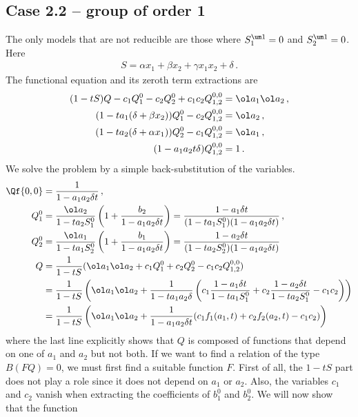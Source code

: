 \subsection{Case 2.2 -- group of order 1}
The only models that are not reducible are those where $S_1^{\um 1} = 0$ and $S_2^{\um 1} = 0$. Here
\begin{align}
	S = \alpha x_1 + \beta x_2 + \gamma x_1 x_2 + \delta\,.
\end{align}
The functional equation and its zeroth term extractions are
\begin{align}\begin{split}
(1-tS)Q - c_1 Q_1^0- c_2 Q_2^0+ c_1c_2 Q_{1,2}^{0,0}  &= \ol a_1\ol a_2\,,\\
(1-ta_1 (\delta+\beta x_2))Q_1^0 - c_2Q_{1,2}^{0,0} &=\ol a_2\,,\\
(1-ta_2 (\delta+\alpha x_1))Q_2^0 - c_1Q_{1,2}^{0,0}  &=\ol a_1\,,\\
(1-a_1 a_2 t \delta)Q_{1,2}^{0,0} &= 1\,.
\end{split}\end{align}
We solve the problem by a simple back-substitution of the variables.
\begin{align}
\Qf{0,0} & = \frac{1}{1-a_1a_2\delta t}\,,\\
Q_1^0 & = \frac{\ol a_2}{1-t a_2 S_1^0}\left(1+\frac{b_2}{1-a_1a_2 \delta t}\right) = \frac{1 -  a_1 \delta t}{(1-t a_1S_1^0)(1-a_1a_2\delta t)}\,,\\
Q_2^0 & = \frac{\ol a_1}{1-t a_1 S_2^0}\left(1+\frac{b_1}{1-a_1a_2 \delta t}\right) = \frac{1 -  a_2 \delta t}{(1-t a_2S_2^0)(1-a_1a_2\delta t)}\\
Q &= \frac{1}{1-tS}(\ol a_1\ol a_2 + c_1 Q_1^0 + c_2 Q_2^0 - c_1 c_2 Q_{1,2}^{0,0})\\
&=\frac{1}{1-tS}\left (\ol a_1\ol a_2 + \frac{1}{1-ta_1a_2 \delta}\left(c_1 \frac{1 -  a_1 \delta t}{1-t a_1S_1^0} + c_2 \frac{1 -  a_2 \delta t}{1-t a_2S_1^0} - c_1 c_2 \right) \right)\\
&= \frac{1}{1-tS}\left(\ol a_1\ol a_2 + \frac{1}{1-a_1a_2\delta t}(c_1 f_1(a_1,t) + c_2 f_2(a_2,t)-c_1c_2)\right)
\end{align}
where the last line explicitly shows that $Q$ is composed of functions that depend on one of $a_1$ and $a_2$ but not both. If we want to find a relation of the type $B(FQ) = 0$, we must first find a suitable function $F$. First of all, the $1-tS$ part does not play a role since it does not depend on $a_1$ or $a_2$. Also, the variables $c_1$ and $c_2$ vanish when extracting the coefficients of $b_1^0$ and $b_2^0$. We will now show that the function
